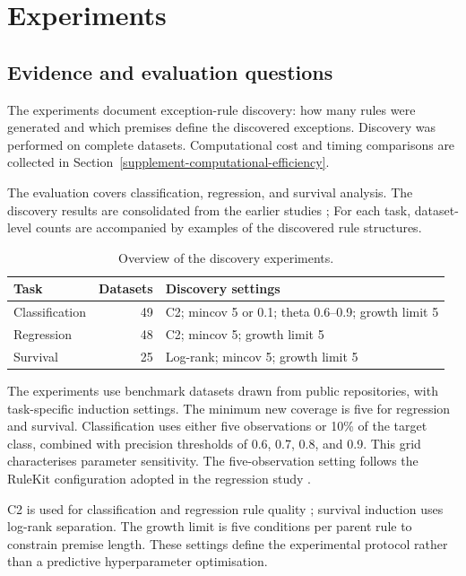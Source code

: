 \section{Experiments}
\label{supplement-experiments}

\subsection{Evidence and evaluation questions}
\label{experiments}

\label{evidence-and-evaluation-questions}
The experiments document exception-rule discovery: how many rules were
generated and which premises define the discovered exceptions. Discovery was
performed on complete datasets. Computational cost and timing comparisons are collected in
Section~\ref{supplement-computational-efficiency}.

The evaluation covers classification, regression, and survival analysis.
The discovery results are consolidated from the earlier studies
\cite{MachaRegression2026,MachaSurvival2026};
For each task, dataset-level counts are accompanied by examples of the
discovered rule structures.


\begin{table}[htbp]
\centering
\small
\caption{Overview of the discovery experiments.}
\begin{tabularx}{\linewidth}{@{}lrX@{}}
\toprule
Task & Datasets & Discovery settings \\
\midrule
Classification & 49 & C2; mincov 5 or 0.1; theta 0.6--0.9; growth limit 5 \\
Regression & 48 & C2; mincov 5; growth limit 5 \\
Survival & 25 & Log-rank; mincov 5; growth limit 5 \\
\bottomrule
\end{tabularx}
\end{table}

The experiments use benchmark datasets drawn from public repositories,
with task-specific induction settings.
The minimum new coverage is five for regression and survival. Classification
uses either five observations or 10\% of the target class, combined with
precision thresholds of 0.6, 0.7, 0.8, and 0.9. This grid characterises
parameter sensitivity. The five-observation setting follows the RuleKit
configuration adopted in the regression study \cite{MachaRegression2026}.

C2 is used for classification and regression rule quality
\cite{Wrobel2016}; survival induction uses log-rank separation. The growth
limit is five conditions per parent rule to constrain premise length.
These settings define the experimental protocol rather than a predictive
hyperparameter optimisation. 


